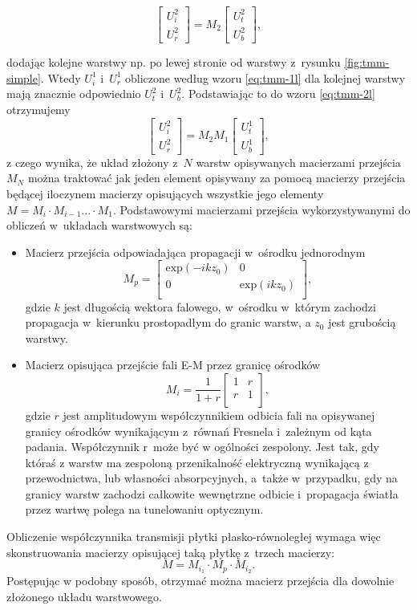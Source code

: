 \begin{equation}
	\begin{bmatrix}
	U_i^2 \\ 
	U_r^2
	\end{bmatrix}
	= M_2 
	\begin{bmatrix}
	U_t^2 \\
	U_b^2
	\end{bmatrix},
\label{eq:tmm-2l}
\end{equation}

dodając kolejne warstwy np. po lewej stronie od warstwy z~rysunku \ref{fig:tmm-simple}. Wtedy $U_i^1$ i~$U_r^1$ obliczone według wzoru \ref{eq:tmm-1l} dla kolejnej warstwy mają znacznie odpowiednio $U_t^2$ i~$U_b^2$. Podstawiając to do wzoru \ref{eq:tmm-2l} otrzymujemy 
\begin{equation}
\begin{bmatrix}
U_i^2 \\ 
U_r^2
\end{bmatrix}
=M_2 M_1 
\begin{bmatrix}
U_t^1 \\
U_b^1
\end{bmatrix},
\label{eq:tmm-2ls}
\end{equation}
z czego wynika, że układ złożony z~$N$ warstw opisywanych macierzami przejścia $M_N$ można traktować jak jeden element opisywany za pomocą macierzy przejścia będącej iloczynem macierzy opisujących wszystkie jego elementy $M= M_i \cdot M_{i-1} ... \cdot M_1$. Podstawowymi macierzami przejścia wykorzystywanymi do obliczeń w~układach warstwowych są:
\begin{itemize}
\item Macierz przejścia odpowiadająca propagacji w~ośrodku jednorodnym 
\begin{equation}
	M_p=
	\begin{bmatrix}
	\textrm{exp}(-i k z_0) & 0 \\
	0	&\textrm{exp}(i k z_0)\\
	\end{bmatrix},
\end{equation}
gdzie $k$ jest długością wektora falowego, w~ośrodku w~którym zachodzi propagacja w~kierunku prostopadłym do granic warstw, a $z_0$ jest grubością warstwy.
\item Macierz opisująca przejście fali E-M przez granicę ośrodków
\begin{equation}
	M_i=\frac{1}{1+r}
	\begin{bmatrix}
	1 &  r \\
	 r & 1\\
	\end{bmatrix},
\end{equation}
gdzie $r$ jest amplitudowym współczynnikiem odbicia fali na opisywanej granicy ośrodków wynikającym z~równań Fresnela i~zależnym od kąta padania. Współczynnik r~może być w ogólności zespolony. Jest tak, gdy któraś z warstw ma zespoloną przenikalność elektryczną wynikającą z przewodnictwa, lub własności absorpcyjnych, a~także w~przypadku, gdy na granicy warstw zachodzi całkowite wewnętrzne odbicie i~propagacja światła przez wartwę polega na tunelowaniu optycznym.
\end{itemize}

Obliczenie współczynnika transmisji płytki płasko-równoległej wymaga więc skonstruowania macierzy opisującej taką płytkę z~trzech macierzy: 
\[
M=M_i_1 \cdot M_p \cdot  M_i_2.
\]
Postępując w podobny sposób, otrzymać można macierz przejścia dla dowolnie złożonego układu warstwowego. 
